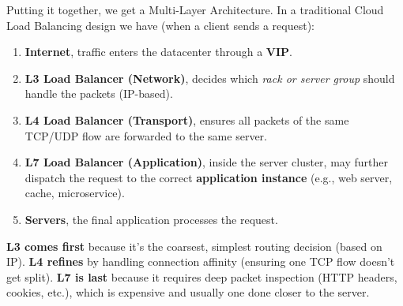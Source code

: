 Putting it together, we get a Multi-Layer Architecture. In a traditional Cloud Load Balancing design we have (when a client sends a request):
\begin{enumerate}
    \item \textbf{Internet}, traffic enters the datacenter through a \textbf{VIP}.
    \item \textbf{L3 Load Balancer (Network)}, decides which \emph{rack or server group} should handle the packets (IP-based).
    \item \textbf{L4 Load Balancer (Transport)}, ensures all packets of the same TCP/\break UDP flow are forwarded to the same server.
    \item \textbf{L7 Load Balancer (Application)}, inside the server cluster, may further dispatch the request to the correct \textbf{application instance} (e.g., web server, cache, microservice).
    \item \textbf{Servers}, the final application processes the request.
\end{enumerate}
\textbf{L3 comes first} because it's the coarsest, simplest routing decision (based on IP). \textbf{L4 refines} by handling connection affinity (ensuring one TCP flow doesn't get split). \textbf{L7 is last} because it requires deep packet inspection (HTTP headers, cookies, etc.), which is expensive and usually one done closer to the server.


